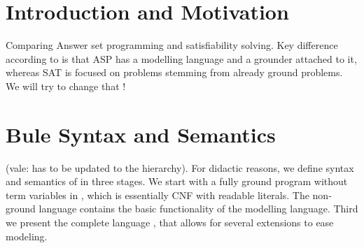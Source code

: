 \documentclass[conference]{IEEEtran}
\newcommand{\vale}[1]{\textcolor[rgb]{1.00,0.00,0.0}{(vale: #1). } }
\begin{document}
\tableofcontents
\section{Introduction and Motivation}

Comparing Answer set programming and satisfiability solving. Key difference
according to \cite{Lierler17} is that ASP has a modelling language and a
grounder attached to it, whereas SAT is focused on problems stemming from
already ground problems. We will try to change that !


\section{Bule Syntax and Semantics}

\vale{has to be updated to the hierarchy}
For didactic reasons, we define syntax and semantics of \bule in three stages. 
We start with a fully ground program without term variables in \bflat, which is essentially CNF with readable literals. 
The non-ground language \bcore contains the basic functionality of the modelling language. 
Third we present the complete language \bfull, that allows for several extensions to ease modeling. 
\end{document}
